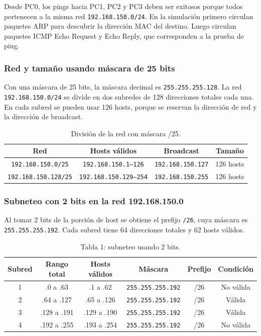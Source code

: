\documentclass[a4paper,12pt]{article}
\newcommand{\ip}[1]{\mbox{\texttt{#1}}}
\begin{document}
Desde PC0, los pings hacia PC1, PC2 y PC3 deben ser exitosos porque todos pertenecen a la misma red \ip{192.168.150.0/24}. En la simulación primero circulan paquetes ARP para descubrir la dirección MAC del destino. Luego circulan paquetes ICMP Echo Request y Echo Reply, que corresponden a la prueba de ping.


\subsubsection{Red y tamaño usando máscara de 25 bits}

Con una máscara de 25 bits, la máscara decimal es \ip{255.255.255.128}. La red \ip{192.168.150.0/24} se divide en dos subredes de 128 direcciones totales cada una. En cada subred se pueden usar 126 hosts, porque se reservan la dirección de red y la dirección de broadcast.

\begin{table}[H]
\centering
\begin{tabular}{|c|c|c|c|}
\hline
Red & Hosts válidos & Broadcast & Tamaño \\
\hline
\ip{192.168.150.0/25} & \ip{192.168.150.1--126} & \ip{192.168.150.127} & 126 hosts \\
\ip{192.168.150.128/25} & \ip{192.168.150.129--254} & \ip{192.168.150.255} & 126 hosts \\
\hline
\end{tabular}
\caption{División de la red con máscara /25.}
\end{table}

\subsubsection{Subneteo con 2 bits en la red 192.168.150.0}

Al tomar 2 bits de la porción de host se obtiene el prefijo \ip{/26}, cuya máscara es \ip{255.255.255.192}. Cada subred tiene 64 direcciones totales y 62 hosts válidos.

\begin{table}[H]
\centering
\small
\begin{tabular}{|c|c|c|c|c|c|}
\hline
Subred & Rango total & Hosts válidos & Máscara & Prefijo & Condición \\
\hline
1 & .0 a .63 & .1 a .62 & \ip{255.255.255.192} & /26 & No válida \\
2 & .64 a .127 & .65 a .126 & \ip{255.255.255.192} & /26 & Válida \\
3 & .128 a .191 & .129 a .190 & \ip{255.255.255.192} & /26 & Válida \\
4 & .192 a .255 & .193 a .254 & \ip{255.255.255.192} & /26 & No válida \\
\hline
\end{tabular}
\caption{Tabla 1: subneteo usando 2 bits.}
\end{table}
\end{document}
